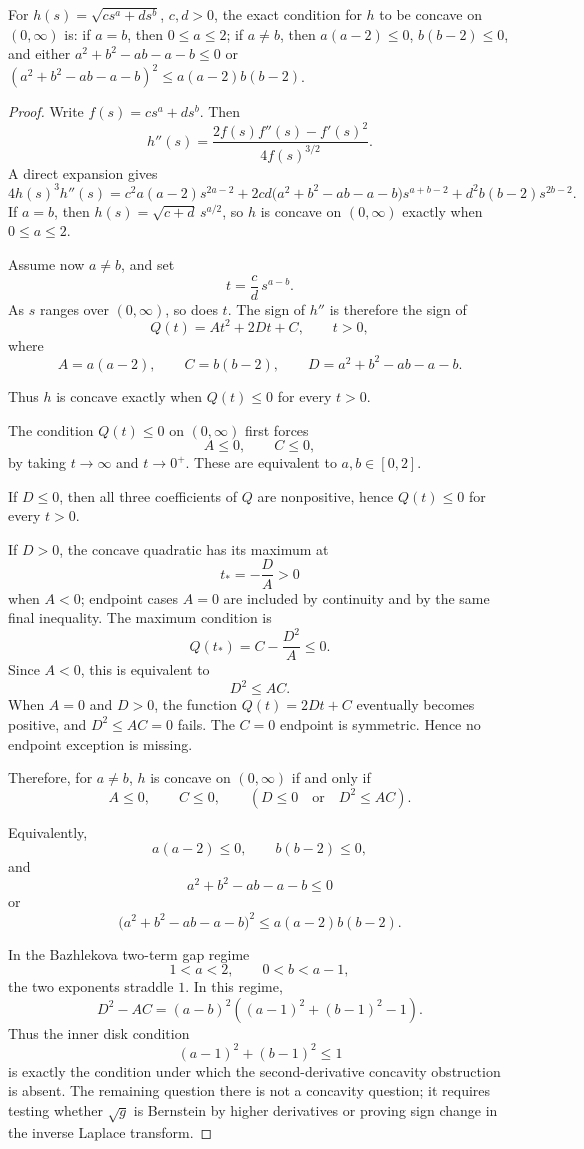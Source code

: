 \begin{proposition}
\label{res:sqrt-two-term-symbol-exact-concavity-criterion}
For \(h(s)=\sqrt{c s^a+d s^b}\), \(c,d>0\), the exact condition for \(h\) to be concave on \((0,\infty)\) is: if \(a=b\), then \(0\le a\le2\); if \(a\ne b\), then \(a(a-2)\le0\), \(b(b-2)\le0\), and either \(a^2+b^2-ab-a-b\le0\) or \((a^2+b^2-ab-a-b)^2\le a(a-2)b(b-2)\).
\end{proposition}
\begin{proof}
Write \(f(s)=c s^a+d s^b\). Then
\[
h''(s)=\frac{2f(s)f''(s)-f'(s)^2}{4f(s)^{3/2}}.
\]
A direct expansion gives
\[
4h(s)^3h''(s)
=c^2 a(a-2)s^{2a-2}
+2cd\bigl(a^2+b^2-ab-a-b\bigr)s^{a+b-2}
+d^2b(b-2)s^{2b-2}.
\]
If \(a=b\), then \(h(s)=\sqrt{c+d}\,s^{a/2}\), so \(h\) is concave on \((0,\infty)\) exactly when \(0\le a\le2\).

Assume now \(a\ne b\), and set
\[
t=\frac cd\,s^{a-b}.
\]
As \(s\) ranges over \((0,\infty)\), so does \(t\). The sign of \(h''\) is therefore the sign of
\[
Q(t)=A t^2+2D t+C,\qquad t>0,
\]
where
\[
A=a(a-2),\qquad C=b(b-2),\qquad D=a^2+b^2-ab-a-b.
\]

Thus \(h\) is concave exactly when \(Q(t)\le0\) for every \(t>0\).

The condition \(Q(t)\le0\) on \((0,\infty)\) first forces
\[
A\le0,\qquad C\le0,
\]
by taking \(t\to\infty\) and \(t\to0^+\). These are equivalent to \(a,b\in[0,2]\).

If \(D\le0\), then all three coefficients of \(Q\) are nonpositive, hence \(Q(t)\le0\) for every \(t>0\).

If \(D>0\), the concave quadratic has its maximum at
\[
t_*=-\frac DA>0
\]
when \(A<0\); endpoint cases \(A=0\) are included by continuity and by the same final inequality. The maximum condition is
\[
Q(t_*)=C-\frac{D^2}{A}\le0.
\]
Since \(A<0\), this is equivalent to
\[
D^2\le AC.
\]
When \(A=0\) and \(D>0\), the function \(Q(t)=2Dt+C\) eventually becomes positive, and \(D^2\le AC=0\) fails. The \(C=0\) endpoint is symmetric. Hence no endpoint exception is missing.

Therefore, for \(a\ne b\), \(h\) is concave on \((0,\infty)\) if and only if
\[
A\le0,\qquad C\le0,\qquad
\left(D\le0\quad\text{or}\quad D^2\le AC\right).
\]

Equivalently,
\[
a(a-2)\le0,\qquad b(b-2)\le0,
\]
and
\[
a^2+b^2-ab-a-b\le0
\]
or
\[
\bigl(a^2+b^2-ab-a-b\bigr)^2
\le a(a-2)b(b-2).
\]

In the Bazhlekova two-term gap regime
\[
1<a<2,\qquad 0<b<a-1,
\]
the two exponents straddle \(1\). In this regime,
\[
D^2-AC=(a-b)^2\left((a-1)^2+(b-1)^2-1\right).
\]
Thus the inner disk condition
\[
(a-1)^2+(b-1)^2\le1
\]
is exactly the condition under which the second-derivative concavity obstruction is absent. The remaining question there is not a concavity question; it requires testing whether \(\sqrt g\) is Bernstein by higher derivatives or proving sign change in the inverse Laplace transform.
\end{proof}

